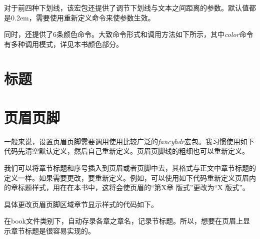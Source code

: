 对于前四种下划线，该宏包还提供了调节下划线与文本之间距离的参数。默认值都是0.2em，需要使用重新定义命令来使参数生效。

\begin{latex}
\CJKunderdotbasesep
\CJKunderlinebasesep
\CJKunderdbllinebasesep
\CJKunderwavebasesep
\renewcommand{\CJKunderlinebasesep}{0.5em}
\end{latex}

同时，还提供了6条颜色命令。大致命令形式和调用方法如下所示，其中\emph{color}命令有多种调用模式，详见本书颜色部分。

\begin{latex}
\CJKunderlinecolor
\renewcommand{\CJKunderline}{\color{blue}}
\end{latex}

\section{标题}

\section{页眉页脚}
一般来说，设置页眉页脚需要调用使用比较广泛的\emph{fancyhdr}宏包。我习惯使用如下代码先清空默认定义，然后自己重新定义。页眉页脚线的粗细也可以重新定义。

\begin{latex}
\usepackage{fancyhdr}
\pagestyle{fancy}
\fancyhf{}%
    \lhead{}%
    \cfoot{}
    \fancyhead[RO,LE]{}%
    \fancyfoot[LE,RO]{\thepage}
\renewcommand{\headrulewidth}{0.4 pt}
\renewcommand{\footrulewidth}{0.4 pt}
\end{latex}


我们可以将章节标题和序号插入到页眉或者页脚中去，其格式与正文中章节标题的定义一样。如果需要更改，要重新定义。例如，可以使用如下代码重新定义页眉内的章标题样式，用在在本书中，这将会使页眉的“第X章 版式”更改为“X 版式”。 

具体更改页眉页脚区域章节显示样式的代码如下。

\begin{latex}
\renewcommand{\chaptermark}[1]{\markleft{\thesection.\#1}}
\renewcommand{\chaptermark}[1]{\markboth{\thechapter.\ #1}{节样式空置表示修改章样式}}
\renewcommand{\chaptermark}[1]{\markboth{章样式}{节样式}}
\end{latex}

在book文件类别下，\emph{\leftmark}自动存录各章之章名，\emph{\rightmark}记录节标题。所以，想要在页眉上显示章节标题是很容易实现的。

